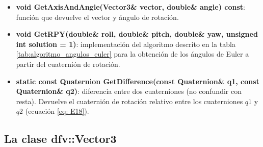 \documentclass[12pt, a4paper]{report}
\begin{document}
\begin{itemize}
\item \textbf{void GetAxisAndAngle(Vector3\& vector, double\& angle) const}: función que devuelve el vector y ángulo de rotación.
\item \textbf{void GetRPY(double\& roll, double\& pitch, double\& yaw, unsigned int solution = 1)}: implementación del algoritmo descrito en la tabla \ref{tab:algoritmo_angulos_euler} para la obtención de los ángulos de Euler a partir del cuaternión de rotación.
\item \textbf{static const Quaternion GetDifference(const Quaternion\& q1, const Quaternion\& q2)}: diferencia entre dos cuaterniones (no confundir con resta). Devuelve el cuaternión de rotación relativo entre los cuaterniones $q1$ y $q2$ (ecuación \eqref{eq: E18}).  

\end{itemize}

\subsection{La clase dfv::Vector3}
\end{document}
